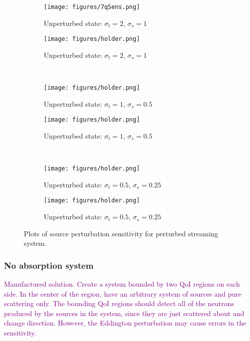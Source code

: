 \documentclass{article}
\newcommand{\sigt}{\sigma_t}
\newcommand{\sigs}{\sigma_s}
\newcommand{\comment}[2]{\marginpar{\textcolor{#2}{$\star$}}\textcolor{#2}{#1}\newline}
\newcommand{\todo}[1]{\comment{#1}{purple}}
\newcommand{\todo}[1]{\phantom{a}}
\begin{document}
\begin{figure}[H]
\label{InHomoPertq}
\centering
\begin{subfigure}{.5\textwidth}
  \centering
  \texttt{[image: figures/7qSens.png]}
  \caption{Unperturbed state: $\sigt=2$, $\sigs=1$}
  \label{fig:sfig1}
\end{subfigure}%
\begin{subfigure}{.5\textwidth}
  \centering
  \texttt{[image: figures/holder.png]}
  \caption{Unperturbed state: $\sigt=2$, $\sigs=1$}
  \label{fig:sfig4}
\end{subfigure}%
\\
\begin{subfigure}{.5\textwidth}
  \centering
  \texttt{[image: figures/holder.png]}
  \caption{Unperturbed state: $\sigt=1$, $\sigs=0.5$}
  \label{fig:sfig2}
\end{subfigure}%
\begin{subfigure}{.5\textwidth}
  \centering
  \texttt{[image: figures/holder.png]}
  \caption{Unperturbed state: $\sigt=1$, $\sigs=0.5$}
  \label{fig:sfig5}
\end{subfigure}%
\\
\begin{subfigure}{.5\textwidth}
  \centering
  \texttt{[image: figures/holder.png]}
  \caption{Unperturbed state: $\sigt=0.5$, $\sigs=0.25$}
  \label{fig:sfig3}
\end{subfigure}%
\begin{subfigure}{.5\textwidth}
  \centering
  \texttt{[image: figures/holder.png]}
  \caption{Unperturbed state: $\sigt=0.5$, $\sigs=0.25$}
  \label{fig:sfig6}
\end{subfigure}%
\caption{Plots of source perturbation sensitivity for perturbed streaming system.}
\label{fig:fig}
\end{figure}


\subsubsection{No absorption system}
\todo{Manufactured solution. Create a system bounded by two QoI regions on each side. In the center of the region, have an arbitrary system of sources and pure scattering only. The bounding QoI regions should detect all of the neutrons produced by the sources in the system, since they are just scattered about and change direction. However, the Eddington perturbation may cause errors in the sensitivity.}

\newpage


 


\end{document}
